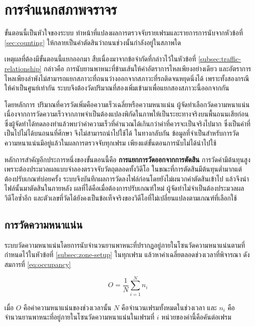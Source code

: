 \section{การจำแนกสภาพจราจร}
\label{sec:traffic-classification}

ขั้นตอนนี้เป็นหัวใจของระบบ ทำหน้าที่แปลงผลการตรวจจับรายเฟรมและรายการการนับจากหัวข้อที่ \ref{sec:counting} ให้กลายเป็นคำตัดสินว่าถนนช่วงนั้นกำลังอยู่ในสภาพใด

เหตุผลที่ต้องมีขั้นตอนนี้แยกออกมา สืบเนื่องมาจากข้อจำกัดที่กล่าวไว้ในหัวข้อที่ \ref{subsec:traffic-relationship} กล่าวคือ การนับยานพาหนะที่ข้ามเส้นให้ค่าอัตราการไหลเพียงอย่างเดียว และอัตราการไหลเพียงลำพังไม่สามารถแยกสภาวะที่ถนนว่างออกจากสภาวะที่รถติดจนหยุดนิ่งได้ เพราะทั้งสองกรณีให้ค่าเป็นศูนย์เท่ากัน  ระบบจึงต้องวัดปริมาณที่สองเพิ่มเข้ามาเพื่อแยกสองสภาวะนี้ออกจากกัน

โดยหลักการ ปริมาณที่ควรวัดเพิ่มคือความเร็วเฉลี่ยหรือความหนาแน่น ผู้จัดทำเลือกวัดความหนาแน่น เนื่องจากการวัดความเร็วจากภาพจำเป็นต้องแปลงพิกัดในภาพให้เป็นระยะทางจริงบนพื้นถนนเสียก่อน ซึ่งผู้จัดทำได้ทดลองทำแล้วพบว่าค่าความเร็วที่คำนวณได้เกินกว่าค่าที่ควรจะเป็นจริงไปมาก ซึ่งเป็นค่าที่เป็นไปไม่ได้บนถนนที่ศึกษา จึงไม่สามารถนำไปใช้ได้ ในทางกลับกัน ข้อมูลที่จำเป็นสำหรับการวัดความหนาแน่นมีอยู่แล้วในผลการตรวจจับทุกเฟรม เพียงแต่ขั้นตอนการนับไม่ได้นำไปใช้

หลักการสำคัญอีกประการหนึ่งของขั้นตอนนี้คือ \textbf{การแยกการวัดออกจากการตัดสิน} การวัดค่ามีต้นทุนสูงเพราะต้องประมวลผลแบบจำลองตรวจจับวัตถุตลอดทั้งวิดีโอ ในขณะที่การตัดสินมีต้นทุนต่ำมากแต่ต้องปรับเกณฑ์บ่อยครั้ง ระบบจึงบันทึกผลการวัดลงไฟล์ก่อนโดยยังไม่ผนวกคำตัดสินเข้าไป แล้วจึงนำไฟล์นั้นมาตัดสินในภายหลัง  ผลที่ได้คือเมื่อต้องการปรับเกณฑ์ใหม่ ผู้จัดทำไม่จำเป็นต้องประมวลผลวิดีโอซ้ำอีก และตัวเลขที่วัดได้ยังคงเป็นข้อเท็จจริงของวิดีโอที่ไม่เปลี่ยนแปลงตามเกณฑ์ที่เลือกใช้

\subsection{การวัดความหนาแน่น}
\label{subsec:occupancy}

ระบบวัดความหนาแน่นโดยการนับจำนวนยานพาหนะที่ปรากฏอยู่ภายในโซนวัดความหนาแน่นตามที่กำหนดไว้ในหัวข้อที่ \ref{subsec:zone-setup} ในทุกเฟรม แล้วหาค่าเฉลี่ยตลอดช่วงเวลาที่พิจารณา ดังสมการที่ \ref{eq:occupancy}

\begin{equation}
    O = \frac{1}{N}\sum_{i=1}^{N} n_i
    \label{eq:occupancy}
\end{equation}

เมื่อ $O$ คือค่าความหนาแน่นของช่วงเวลานั้น $N$ คือจำนวนเฟรมทั้งหมดในช่วงเวลา และ $n_i$ คือจำนวนยานพาหนะที่อยู่ภายในโซนวัดความหนาแน่นในเฟรมที่ $i$ หน่วยของค่านี้คือคันต่อเฟรม

